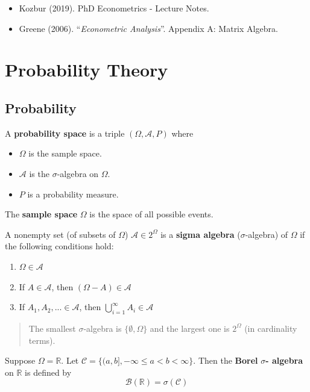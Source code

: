 \documentclass[12pt,]{book}
\providecommand{\tightlist}{%
  \setlength{\itemsep}{0pt}\setlength{\parskip}{0pt}}
\begin{document}
\begin{itemize}
\tightlist
\item
  Kozbur (2019). PhD Econometrics - Lecture Notes.
\item
  Greene (2006). ``\emph{Econometric Analysis}''. Appendix A: Matrix Algebra.
\end{itemize}

\hypertarget{appendix2}{%
\chapter{Probability Theory}\label{appendix2}}

\hypertarget{probability}{%
\section{Probability}\label{probability}}

A \textbf{probability space} is a triple \((\Omega, \mathcal A, P)\) where

\begin{itemize}
\tightlist
\item
  \(\Omega\) is the sample space.
\item
  \(\mathcal A\) is the \(\sigma\)-algebra on \(\Omega\).
\item
  \(P\) is a probability measure.
\end{itemize}

The \textbf{sample space} \(\Omega\) is the space of all possible events.

A nonempty set (of subsets of \(\Omega\)) \(\mathcal A \in 2^\Omega\) is a \textbf{sigma algebra} (\(\sigma\)-algebra) of \(\Omega\) if the following conditions hold:

\begin{enumerate}
\def\labelenumi{\arabic{enumi}.}
\tightlist
\item
  \(\Omega \in \mathcal A\)
\item
  If \(A \in \mathcal A\), then \((\Omega - A) \in \mathcal A\)
\item
  If \(A_1, A_2, ... \in \mathcal A\), then \(\bigcup _ {i=1}^{\infty} A_i \in \mathcal A\)
\end{enumerate}

\begin{quote}
The smallest \(\sigma\)-algebra is \(\{ \emptyset, \Omega \}\) and the largest one is \(2^\Omega\) (in cardinality terms).
\end{quote}

Suppose \(\Omega = \mathbb R\). Let \(\mathcal{C} = \{ (a, b],-\infty \leq a<b<\infty \}\). Then the \textbf{Borel} \(\sigma\)\textbf{- algebra} on \(\mathbb R\) is defined by
\[
  \mathcal B (\mathbb R) = \sigma (\mathcal C)
\]
\end{document}
